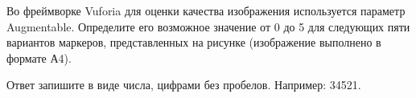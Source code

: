 
Во фреймворке Vuforia для оценки качества изображения используется параметр Augmentable. Определите его возможное значение от 0 до 5 для следующих пяти вариантов маркеров, представленных на рисунке (изображение выполнено в формате А4).


Ответ запишите в виде числа, цифрами без пробелов. Например: 34521.

